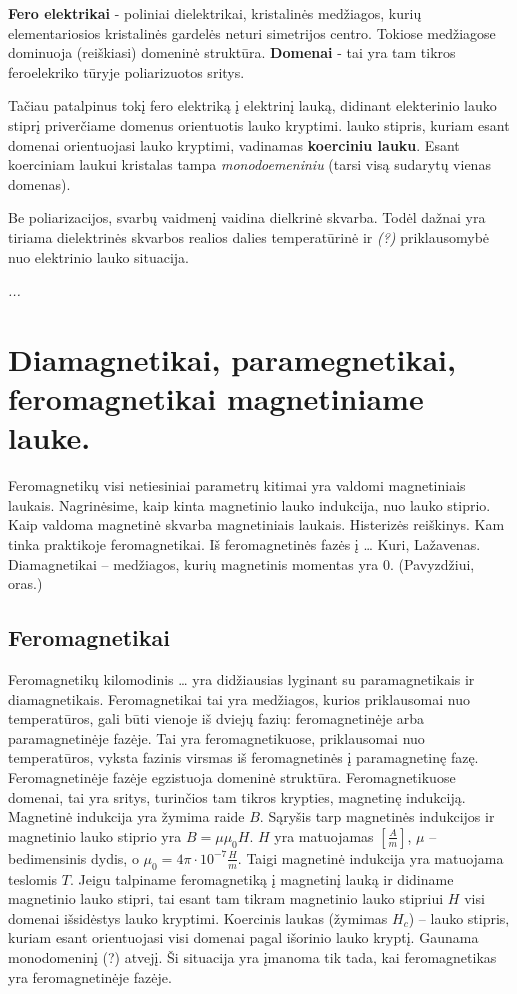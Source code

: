 \textbf{Fero elektrikai} - poliniai dielektrikai,
kristalinės medžiagos, kurių elementariosios kristalinės gardelės neturi simetrijos centro.
Tokiose medžiagose dominuoja (reiškiasi) domeninė struktūra.
\textbf{Domenai} - tai yra tam tikros feroelekriko tūryje poliarizuotos sritys.

Tačiau patalpinus tokį fero elektriką į elektrinį lauką,
didinant elekterinio lauko stiprį priverčiame domenus orientuotis lauko kryptimi.
lauko stipris, kuriam esant domenai orientuojasi lauko kryptimi,
vadinamas \textbf{koerciniu lauku}.
Esant koerciniam laukui kristalas tampa \textit{monodoemeniniu} (tarsi visą sudarytų vienas domenas).

Be poliarizacijos, svarbų vaidmenį vaidina dielkrinė skvarba.
Todėl dažnai yra tiriama dielektrinės skvarbos realios dalies temperatūrinė ir \textit{(?)} priklausomybė nuo elektrinio lauko situacija.

\textit{...}

\section{Diamagnetikai, paramegnetikai, feromagnetikai magnetiniame lauke.}
Feromagnetikų visi netiesiniai parametrų kitimai yra valdomi magnetiniais
laukais. Nagrinėsime, kaip kinta magnetinio lauko indukcija, nuo
lauko stiprio. Kaip valdoma magnetinė skvarba magnetiniais laukais.
Histerizės reiškinys. Kam tinka praktikoje feromagnetikai. Iš
feromagnetinės fazės į … Kuri, Lažavenas. Diamagnetikai – medžiagos, kurių
magnetinis momentas yra 0. (Pavyzdžiui, oras.)

\subsection{Feromagnetikai}

Feromagnetikų kilomodinis … yra didžiausias lyginant su
paramagnetikais ir diamagnetikais. Feromagnetikai tai yra medžiagos,
kurios priklausomai nuo temperatūros, gali būti vienoje iš dviejų
fazių: feromagnetinėje arba paramagnetinėje fazėje. Tai yra
feromagnetikuose, priklausomai nuo temperatūros, vyksta fazinis virsmas
iš feromagnetinės į paramagnetinę fazę. Feromagnetinėje fazėje
egzistuoja domeninė struktūra. Feromagnetikuose domenai, tai yra
sritys, turinčios tam tikros krypties, magnetinę indukciją.
Magnetinė indukcija yra žymima raide $B$. Sąryšis tarp magnetinės
indukcijos ir magnetinio lauko stiprio yra $B = \mu\mu_{0}H$.
$H$ yra matuojamas $\left[ \frac{A}{m} \right]$, $\mu$ – bedimensinis
dydis, o $\mu_{0} = 4 \pi \cdot 10 ^{-7}\frac{H}{m}$. Taigi
magnetinė indukcija yra matuojama teslomis $T$. Jeigu talpiname
feromagnetiką į magnetinį lauką ir didiname magnetinio lauko stipri,
tai esant tam tikram magnetinio lauko stipriui $H$ visi domenai išsidėstys
lauko kryptimi. Koercinis laukas (žymimas $H_{c}$) – lauko stipris,
kuriam esant orientuojasi visi domenai pagal išorinio lauko kryptį.
Gaunama monodomeninį (?) atvejį. Ši situacija yra įmanoma tik tada,
kai feromagnetikas yra feromagnetinėje fazėje.

